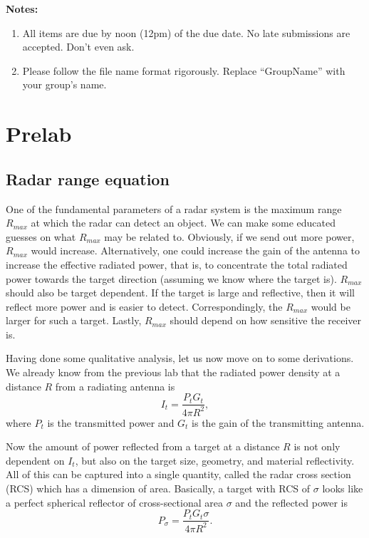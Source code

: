 \documentclass[letterpaper, 11pt]{article}
\begin{document}
\textbf{Notes:}
\begin{enumerate}
	\item All items are due by noon (12pm) of the due date. No late submissions are accepted. Don't even ask. 
	
	\item Please follow the file name format rigorously. Replace ``GroupName'' with your group's name.
\end{enumerate}

\newpage
\section{Prelab}


\subsection{Radar range equation}
One of the fundamental parameters of a radar system is the maximum range $R_{max}$ at which the radar can detect an object. We can make some educated guesses on what $R_{max}$ may be related to. Obviously, if we send out more power, $R_{max}$ would increase. Alternatively, one could increase the gain of the antenna to increase the effective radiated power, that is, to concentrate the total radiated power towards the target direction (assuming we know where the target is). $R_{max}$ should also be target dependent. If the target is large and reflective, then it will reflect more power and is easier to detect. Correspondingly, the $R_{max}$ would be larger for such a target. Lastly, $R_{max}$ should depend on how sensitive the receiver is. 

Having done some qualitative analysis, let us now move on to some derivations. We already know from the previous lab that the radiated power density at a distance $R$ from a radiating antenna is 
\[
I_t = \frac{P_t G_t}{4\pi R^2},
\]
where $P_t$ is the transmitted power and $G_t$ is the gain of the transmitting antenna. 

Now the amount of power reflected from a target at a distance $R$ is not only dependent on $I_t$, but also on the target size, geometry, and material reflectivity. All of this can be captured into a single quantity, called the radar cross section (RCS) which has a dimension of area. Basically, a target with RCS of $\sigma$ looks like a perfect spherical reflector of cross-sectional area $\sigma$ and the reflected power is 
\[
P_{\sigma} = \frac{P_t G_t \sigma}{4\pi R^2}.
\]
\end{document}
